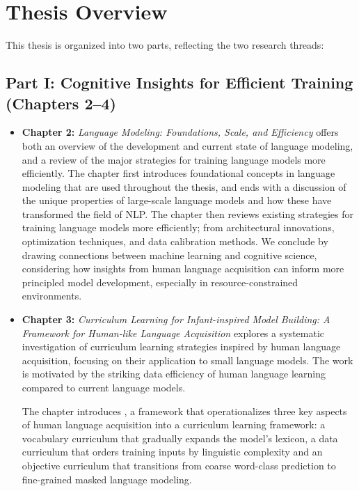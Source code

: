 \section*{Thesis Overview}

This thesis is organized into two parts, reflecting the two research threads:

\subsection*{Part I: Cognitive Insights for Efficient Training (Chapters 2–4)}

\begin{itemize}

    \item \textbf{Chapter 2:} \emph{Language Modeling: Foundations, Scale, and Efficiency} offers both an overview of the development and current state of language modeling, and a review of the major strategies for training language models more efficiently. The chapter first introduces foundational concepts in language modeling that are used throughout the thesis, and ends with a discussion of the unique properties of large-scale language models and how these have transformed the field of NLP. The chapter then reviews existing strategies for training language models more efficiently; from architectural innovations, optimization techniques, and data calibration methods. We conclude by drawing connections between machine learning and cognitive science, considering how insights from human language acquisition can inform more principled model development, especially in resource-constrained environments.

    \item \textbf{Chapter 3:} \emph{Curriculum Learning for Infant-inspired Model Building: A Framework for Human-like Language Acquisition}  
    explores a systematic investigation of curriculum learning strategies inspired by human language acquisition, focusing on their application to small language models. The work is motivated by the striking data efficiency of human language learning compared to current language models.

    The chapter introduces \climb, a framework that operationalizes three key aspects of human language acquisition into a curriculum learning framework: a vocabulary curriculum that gradually expands the model's lexicon, a data curriculum that orders training inputs by linguistic complexity and an objective curriculum that transitions from coarse word-class prediction to fine-grained masked language modeling.


\end{itemize}
